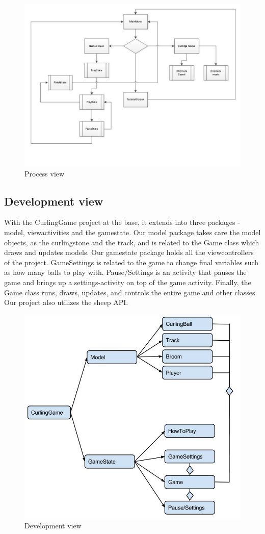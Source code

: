 \newpage
\begin{figure}[ht!]
	\centering
	\includegraphics[width=150mm]{viewpoint.jpg}
	\caption{Process view}
	\label{fig:viewpoint}
\end{figure}

\subsection{Development view}
With the CurlingGame project at the base, it extends into three packages - model, viewactivities and the gamestate. Our model package takes care the model objects, as the curlingstone and the track, and is related to the Game class which draws and updates models. Our gamestate package holds all the viewcontrollers of the project. GameSettings is related to the game to change final variables such as how many balls to play with. Pause/Settings is an activity that pauses the game and brings up a settings-activity on top of the game activity. Finally, the Game class runs, draws, updates, and controls the entire game and other classes. Our project also utilizes the sheep API.

\newpage
\begin{figure}[ht!]
	\centering
	\includegraphics[width=150mm]{development_view.jpg}
	\caption{Development view}
	\label{fig:viewpoint}
\end{figure}